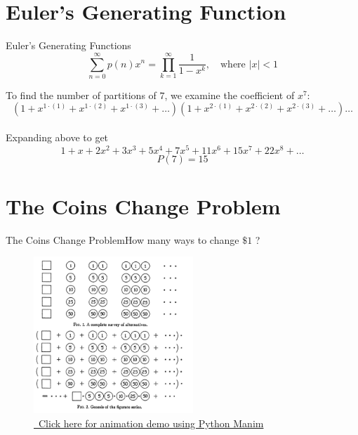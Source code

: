 \documentclass{beamer}
\begin{document}
    \section{Euler’s Generating Function}
    \begin{frame}{Euler’s Generating Functions}
        \begin{equation}
            \sum_{n=0}^{\infty} p(n) x^n = \prod_{k=1}^{\infty} \frac{1}{1-x^k}, \quad \text{where } |x| < 1
        \end{equation}

        \begin{example}
            To find the number of partitions of $7$, we examine the coefficient of $x^7$:
            \begin{equation}
                (1 + x^{1\cdot(1)} + x^{1\cdot(2)} + x^{1\cdot(3)} + \ldots )(1 + x^{2\cdot(1)} + x^{2\cdot(2)} + x^{2\cdot(3)} + \ldots ) \ldots
            \end{equation} \\
            Expanding above to get
            \begin{equation}
                1 + x + 2x^2 + 3x^3 + 5x^4 + 7x^5 + 11x^6 + 15x^7 + 22x^8 + \ldots
            \end{equation}
            \begin{equation}
                P(7) = 15
            \end{equation}
        \end{example}
    \end{frame}

    \section{The Coins Change Problem}
    \begin{frame}{The Coins Change Problem}{How many ways to change $\$1$ ?}
        \begin{figure}[h!]
        \centering
            \includegraphics[width=6cm]{images/coins-change.jpg}
            \caption{\href{https://youtu.be/PmR1eRswj3A}{\small\ Click here for animation demo using Python Manim}}
        \end{figure}
    \end{frame}
\end{document}
